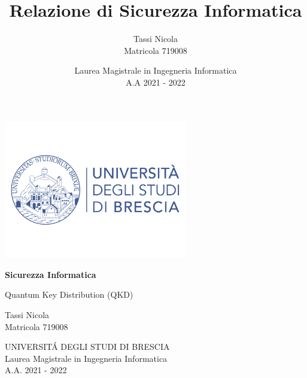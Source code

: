 \documentclass[a4paper, 12pt]{report}
\title{Relazione di Sicurezza Informatica}
\author{Tassi Nicola \\ Matricola 719008}
\date{Laurea Magistrale in Ingegneria Informatica \\ A.A 2021 - 2022}
\begin{document}
\begin{spacing}{1.15}

\begin{titlepage}
    \begin{center}
        \includegraphics[width=0.6\textwidth]{MainContent/img/intro/logo-Unibs.png}
        
        \LARGE
        \textbf{Sicurezza Informatica}
        
        \vspace{0.8cm}
        
        \LARGE
        Quantum Key Distribution (QKD)
            
        \vspace{2.5cm}
        
        Tassi Nicola \\ Matricola 719008
            
        \vfill
        
        \Large
        UNIVERSITÁ DEGLI STUDI DI BRESCIA\\
        Laurea Magistrale in Ingegneria Informatica\\
        A.A. 2021 - 2022
            
    \end{center}
\end{titlepage}

\tableofcontents
{}
\thispagestyle{empty}









\end{spacing}

\nocite{*}


\end{document}
